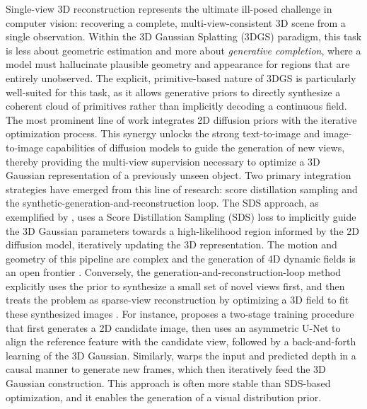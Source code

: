 \documentclass[11pt,a4paper]{article}
\begin{document}
Single-view 3D reconstruction represents the ultimate ill-posed challenge in computer vision: recovering a complete, multi-view-consistent 3D scene from a single observation. Within the 3D Gaussian Splatting (3DGS) paradigm, this task is less about geometric estimation and more about \emph{generative completion}, where a model must hallucinate plausible geometry and appearance for regions that are entirely unobserved. The explicit, primitive-based nature of 3DGS is particularly well-suited for this task, as it allows generative priors to directly synthesize a coherent cloud of primitives rather than implicitly decoding a continuous field. The most prominent line of work \cite{arxiv:2312.17142v2,arxiv:2504.13204v2,arxiv:2312.11458v1,arxiv:2506.02751v3} integrates 2D diffusion priors with the iterative optimization process. This synergy unlocks the strong text-to-image and image-to-image capabilities of diffusion models to guide the generation of new views, thereby providing the multi-view supervision necessary to optimize a 3D Gaussian representation of a previously unseen object. Two primary integration strategies have emerged from this line of research: score distillation sampling and the synthetic-generation-and-reconstruction loop. The SDS approach, as exemplified by \cite{arxiv:2504.13204v2,arxiv:2506.02751v3}, uses a Score Distillation Sampling (SDS) loss to implicitly guide the 3D Gaussian parameters towards a high-likelihood region informed by the 2D diffusion model, iteratively updating the 3D representation. The motion and geometry of this pipeline are complex and the generation of 4D dynamic fields is an open frontier \cite{arxiv:1702.03253v1,arxiv:2312.08746v2}. Conversely, the generation-and-reconstruction-loop method explicitly uses the prior to synthesize a small set of novel views first, and then treats the problem as sparse-view reconstruction by optimizing a 3D field to fit these synthesized images \cite{arxiv:2504.13204v2,arxiv:2312.11458v1}. For instance, \cite{arxiv:2504.13204v2} proposes a two-stage training procedure that first generates a 2D candidate image, then uses an asymmetric U-Net to align the reference feature with the candidate view, followed by a back-and-forth learning of the 3D Gaussian. Similarly, \cite{arxiv:2312.11458v1} warps the input and predicted depth in a causal manner to generate new frames, which then iteratively feed the 3D Gaussian construction. This approach is often more stable than SDS-based optimization, and it enables the generation of a visual distribution prior.
\end{document}
